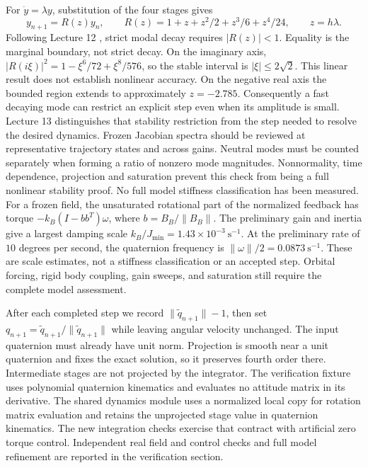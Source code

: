 For $\dot y=\lambda y$, substitution of the four stages gives
\[
y_{n+1}=R(z)y_n,\qquad
R(z)=1+z+z^2/2+z^3/6+z^4/24,\qquad z=h\lambda.
\]
Following Lecture 12 \cite{goza12}, strict modal decay requires $|R(z)|<1$.
Equality is the marginal boundary, not strict decay. On the imaginary axis,
$|R(i\xi)|^2=1-\xi^6/72+\xi^8/576$, so the stable interval is
$|\xi|\leq2\sqrt2$. This linear result does not establish nonlinear accuracy.
On the negative real axis the bounded region extends to approximately
$z=-2.785$. Consequently a fast decaying mode can restrict an explicit step
even when its amplitude is small. Lecture 13 \cite{goza13} distinguishes that stability
restriction from the step needed to resolve the desired dynamics.
Frozen Jacobian spectra should be reviewed at representative trajectory
states and across gains. Neutral modes must be counted separately when
forming a ratio of nonzero mode magnitudes. Nonnormality, time dependence,
projection and saturation prevent this check from being a full nonlinear
stability proof. No full model stiffness classification has been measured.
For a frozen field, the unsaturated rotational part of the normalized feedback
has torque $-k_B(I-bb^T)\omega$, where $b=B_B/\|B_B\|$.
The preliminary gain and inertia give a largest damping scale
$k_B/J_{\min}=1.43\times10^{-3}\ \mathrm{s}^{-1}$.
At the preliminary rate of $10$ degrees per second, the quaternion frequency
is $\|\omega\|/2=0.0873\ \mathrm{s}^{-1}$.
These are scale estimates, not a stiffness classification or an accepted step.
Orbital forcing, rigid body coupling, gain sweeps, and saturation still require
the complete model assessment.

After each completed step we record $\|\widetilde q_{n+1}\|-1$, then set
$q_{n+1}=\widetilde q_{n+1}/\|\widetilde q_{n+1}\|$ while leaving angular
velocity unchanged. The input quaternion must already have unit norm.
Projection is smooth near a unit quaternion and fixes the exact solution,
so it preserves fourth order there. Intermediate stages are not projected by
the integrator. The verification fixture uses polynomial quaternion kinematics
and evaluates no attitude matrix in its derivative. The shared dynamics module uses a normalized local copy for rotation matrix
evaluation and retains the unprojected stage value in quaternion kinematics.
The new integration checks exercise that contract with artificial zero torque
control. Independent real field and control checks and full model refinement are reported in the verification section.

